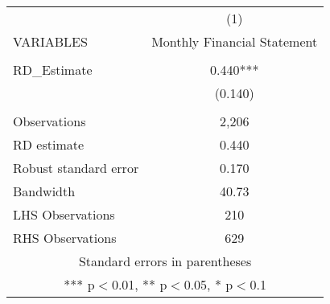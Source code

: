 \begin{tabular}{lc} \hline
 & (1) \\
VARIABLES & Monthly Financial Statement \\ \hline
 &  \\
RD\_Estimate & 0.440*** \\
 & (0.140) \\
 &  \\
Observations & 2,206 \\
RD estimate & 0.440 \\
Robust standard error & 0.170 \\
Bandwidth & 40.73 \\
LHS Observations & 210 \\
 RHS Observations & 629 \\ \hline
\multicolumn{2}{c}{ Standard errors in parentheses} \\
\multicolumn{2}{c}{ *** p$<$0.01, ** p$<$0.05, * p$<$0.1} \\
\end{tabular}
